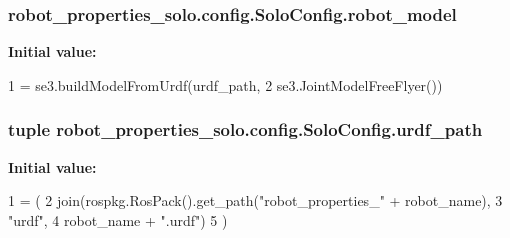 \subsubsection[{\texorpdfstring{robot\+\_\+model}{robot_model}}]{\setlength{\rightskip}{0pt plus 5cm}robot\+\_\+properties\+\_\+solo.\+config.\+Solo\+Config.\+robot\+\_\+model\hspace{0.3cm}{\ttfamily [static]}}\hypertarget{classrobot__properties__solo_1_1config_1_1SoloConfig_a70f240a3708326aa2bb3272b00ce8cec}{}\label{classrobot__properties__solo_1_1config_1_1SoloConfig_a70f240a3708326aa2bb3272b00ce8cec}
{\bfseries Initial value\+:}
\begin{DoxyCode}
1 = se3.buildModelFromUrdf(urdf\_path,
2                                          se3.JointModelFreeFlyer())
\end{DoxyCode}
\subsubsection[{\texorpdfstring{urdf\+\_\+path}{urdf_path}}]{\setlength{\rightskip}{0pt plus 5cm}tuple robot\+\_\+properties\+\_\+solo.\+config.\+Solo\+Config.\+urdf\+\_\+path\hspace{0.3cm}{\ttfamily [static]}}\hypertarget{classrobot__properties__solo_1_1config_1_1SoloConfig_a2ccf8dae7f440112401e8aa66c8ccdc9}{}\label{classrobot__properties__solo_1_1config_1_1SoloConfig_a2ccf8dae7f440112401e8aa66c8ccdc9}
{\bfseries Initial value\+:}
\begin{DoxyCode}
1 = (
2         join(rospkg.RosPack().get\_path(\textcolor{stringliteral}{"robot\_properties\_"} + robot\_name),
3              \textcolor{stringliteral}{"urdf"},
4              robot\_name + \textcolor{stringliteral}{".urdf"})
5     )
\end{DoxyCode}
